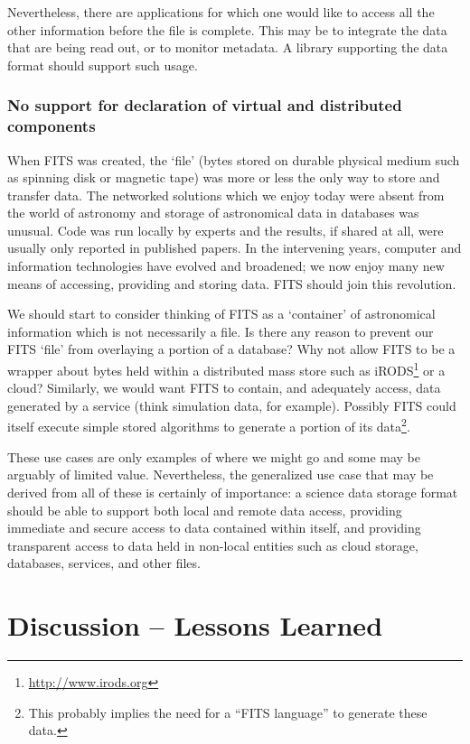 \documentclass[final,authoryear,5p,times,twocolumn]{elsarticle}
\begin{document}
{{Nevertheless, there are applications for which one would like to
access all the other information before the file is complete. This may
be to integrate the data that are being read out, or to monitor
metadata. A library supporting the data format should support such
usage.


\subsubsection{No support for declaration of virtual and distributed components}


When FITS was created, the `file' (bytes stored on durable physical
medium such as spinning disk or magnetic tape) was more or less the
only way to store and transfer data. The networked solutions which we
enjoy today were absent from the world of astronomy and storage of
astronomical data in databases was unusual. Code was run locally by
experts and the results, if shared at all, were usually only reported
in published papers. In the intervening years, computer and
information technologies have evolved and broadened; we now enjoy many
new means of accessing, providing and storing data. FITS should join
this revolution.


We should start to consider thinking of FITS as a `container' of
astronomical information which is not necessarily a file. Is there
any reason to prevent our FITS `file' from overlaying a portion of a
database? Why not allow FITS to be a wrapper about bytes held within a
distributed mass store such as
iRODS\footnote{\url{http://www.irods.org}} \citep[see e.g.,][]{2007AGUFMIN13B1214R}
or a cloud?  Similarly, we would
want FITS to contain, and adequately access, data generated by a
service (think simulation data, for example). Possibly FITS could
itself execute simple stored algorithms to generate a portion of its
data\footnote{This probably implies the need for a ``FITS language'' 
to generate these data.}.


These use cases are only examples of where we might go and some may be
arguably of limited value. Nevertheless, the generalized use case that
may be derived from all of these is certainly of importance:
a science data storage format should be able to support both local 
and remote data access, providing immediate and secure access to data 
contained within itself, and providing transparent access to data held 
in non-local entities such as cloud storage, databases, services, and 
other files.


\section{Discussion -- Lessons Learned}

}}
\end{document}
